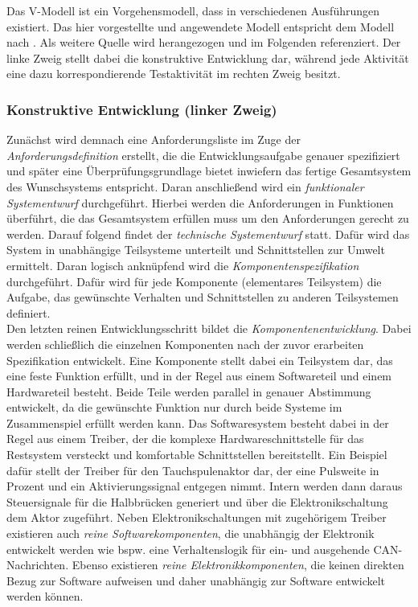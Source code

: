 Das V-Modell ist ein Vorgehensmodell, dass in verschiedenen Ausführungen existiert. Das hier vorgestellte und angewendete Modell entspricht dem Modell nach \cite{Boehm 79}. Als weitere Quelle wird \cite{BasSof} herangezogen und im Folgenden referenziert.
Der linke Zweig stellt dabei die konstruktive Entwicklung dar, während jede Aktivität eine dazu korrespondierende Testaktivität im rechten Zweig besitzt. \\

\subsubsection{Konstruktive Entwicklung (linker Zweig)}
Zunächst wird demnach eine Anforderungsliste im Zuge der \textit{Anforderungsdefinition} erstellt, die die Entwicklungsaufgabe genauer spezifiziert und später eine Überprüfungsgrundlage bietet inwiefern das fertige Gesamtsystem des Wunschsystems entspricht. Daran anschließend wird ein \textit{funktionaler Systementwurf} durchgeführt. Hierbei werden die Anforderungen in Funktionen überführt, die das Gesamtsystem erfüllen muss um den Anforderungen gerecht zu werden. Darauf folgend findet der \textit{technische Systementwurf} statt. Dafür wird das System in unabhängige Teilsysteme unterteilt und Schnittstellen zur Umwelt ermittelt. Daran logisch anknüpfend wird die \textit{Komponentenspezifikation} durchgeführt. Dafür wird für jede Komponente (elementares Teilsystem) die Aufgabe, das gewünschte Verhalten und Schnittstellen zu anderen Teilsystemen definiert. \\
Den letzten reinen Entwicklungsschritt bildet die \textit{Komponentenentwicklung}. Dabei werden schließlich die einzelnen Komponenten nach der zuvor erarbeiten Spezifikation entwickelt. Eine Komponente stellt dabei ein Teilsystem dar, das eine feste Funktion erfüllt, und in der Regel aus einem Softwareteil und einem Hardwareteil besteht. Beide Teile werden parallel in genauer Abstimmung entwickelt, da die gewünschte Funktion nur durch beide Systeme im Zusammenspiel erfüllt werden kann. Das Softwaresystem besteht dabei in der Regel aus einem Treiber, der die komplexe Hardwareschnittstelle für das Restsystem versteckt und komfortable Schnittstellen bereitstellt. Ein Beispiel dafür stellt der Treiber für den Tauchspulenaktor dar, der eine Pulsweite in Prozent und ein Aktivierungssignal entgegen nimmt. Intern werden dann daraus Steuersignale für die Halbbrücken generiert und über die Elektronikschaltung dem Aktor zugeführt.
Neben Elektronikschaltungen mit zugehörigem Treiber existieren auch \textit{reine Softwarekomponenten}, die unabhängig der Elektronik entwickelt werden wie bspw. eine Verhaltenslogik für ein- und ausgehende CAN-Nachrichten. Ebenso existieren \textit{reine Elektronikkomponenten}, die keinen direkten Bezug zur Software aufweisen und daher unabhängig zur Software entwickelt werden können.\\

